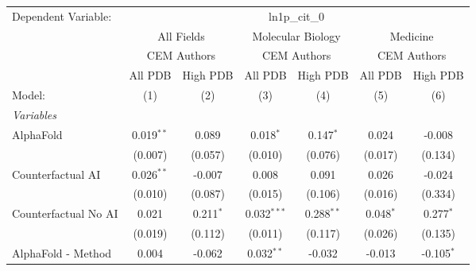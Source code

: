 \begingroup
\centering
\begin{tabular}{lcccccc}
   \tabularnewline \midrule \midrule
   Dependent Variable: & \multicolumn{6}{c}{ln1p\_cit\_0}\\
 & \multicolumn{2}{c}{All Fields} & \multicolumn{2}{c}{Molecular Biology} & \multicolumn{2}{c}{Medicine} \\
\cmidrule(lr){2-3} \cmidrule(lr){4-5} \cmidrule(lr){6-7}
 & \multicolumn{2}{c}{CEM Authors} & \multicolumn{2}{c}{CEM Authors} & \multicolumn{2}{c}{CEM Authors} \\
\cmidrule(lr){2-3} \cmidrule(lr){4-5} \cmidrule(lr){6-7}
 & \multicolumn{1}{c}{All PDB} & \multicolumn{1}{c}{High PDB} & \multicolumn{1}{c}{All PDB} & \multicolumn{1}{c}{High PDB} & \multicolumn{1}{c}{All PDB} & \multicolumn{1}{c}{High PDB} \\
\cmidrule(lr){2-2} \cmidrule(lr){3-3} \cmidrule(lr){4-4} \cmidrule(lr){5-5} \cmidrule(lr){6-6} \cmidrule(lr){7-7}
   Model:                                                     & (1)            & (2)          & (3)            & (4)          & (5)            & (6)\\  
   \midrule
   \emph{Variables}\\
   AlphaFold                                                  & 0.019$^{**}$   & 0.089        & 0.018$^{*}$    & 0.147$^{*}$  & 0.024          & -0.008\\   
                                                              & (0.007)        & (0.057)      & (0.010)        & (0.076)      & (0.017)        & (0.134)\\   
   Counterfactual AI                                          & 0.026$^{**}$   & -0.007       & 0.008          & 0.091        & 0.026          & -0.024\\   
                                                              & (0.010)        & (0.087)      & (0.015)        & (0.106)      & (0.016)        & (0.334)\\   
   Counterfactual No AI                                       & 0.021          & 0.211$^{*}$  & 0.032$^{***}$  & 0.288$^{**}$ & 0.048$^{*}$    & 0.277$^{*}$\\   
                                                              & (0.019)        & (0.112)      & (0.011)        & (0.117)      & (0.026)        & (0.135)\\   
   AlphaFold - Method                                         & 0.004          & -0.062       & 0.032$^{**}$   & -0.032       & -0.013         & -0.105$^{*}$\\   

\end{tabular}
